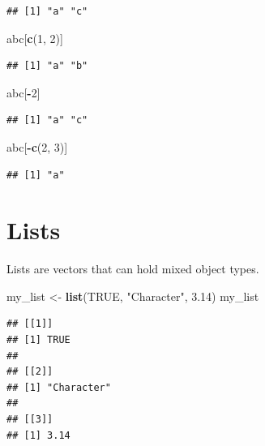 \documentclass[
  openany]{book}
\newenvironment{Shaded}{\begin{snugshade}}{\end{snugshade}}
\newcommand{\DecValTok}[1]{\textcolor[rgb]{0.00,0.00,0.81}{#1}}
\newcommand{\FloatTok}[1]{\textcolor[rgb]{0.00,0.00,0.81}{#1}}
\newcommand{\KeywordTok}[1]{\textcolor[rgb]{0.13,0.29,0.53}{\textbf{#1}}}
\newcommand{\NormalTok}[1]{#1}
\newcommand{\OperatorTok}[1]{\textcolor[rgb]{0.81,0.36,0.00}{\textbf{#1}}}
\newcommand{\OtherTok}[1]{\textcolor[rgb]{0.56,0.35,0.01}{#1}}
\newcommand{\StringTok}[1]{\textcolor[rgb]{0.31,0.60,0.02}{#1}}
\begin{document}
\begin{verbatim}
## [1] "a" "c"
\end{verbatim}

\begin{Shaded}
\begin{Highlighting}[]
\NormalTok{abc[}\KeywordTok{c}\NormalTok{(}\DecValTok{1}\NormalTok{, }\DecValTok{2}\NormalTok{)]}
\end{Highlighting}
\end{Shaded}

\begin{verbatim}
## [1] "a" "b"
\end{verbatim}

\begin{Shaded}
\begin{Highlighting}[]
\NormalTok{abc[}\OperatorTok{-}\DecValTok{2}\NormalTok{]}
\end{Highlighting}
\end{Shaded}

\begin{verbatim}
## [1] "a" "c"
\end{verbatim}

\begin{Shaded}
\begin{Highlighting}[]
\NormalTok{abc[}\OperatorTok{-}\KeywordTok{c}\NormalTok{(}\DecValTok{2}\NormalTok{, }\DecValTok{3}\NormalTok{)]}
\end{Highlighting}
\end{Shaded}

\begin{verbatim}
## [1] "a"
\end{verbatim}

\hypertarget{lists}{%
\section{Lists}\label{lists}}

Lists are vectors that can hold mixed object types.

\begin{Shaded}
\begin{Highlighting}[]
\NormalTok{my_list <-}\StringTok{ }\KeywordTok{list}\NormalTok{(}\OtherTok{TRUE}\NormalTok{, }\StringTok{"Character"}\NormalTok{, }\FloatTok{3.14}\NormalTok{)}
\NormalTok{my_list}
\end{Highlighting}
\end{Shaded}

\begin{verbatim}
## [[1]]
## [1] TRUE
## 
## [[2]]
## [1] "Character"
## 
## [[3]]
## [1] 3.14
\end{verbatim}
\end{document}
